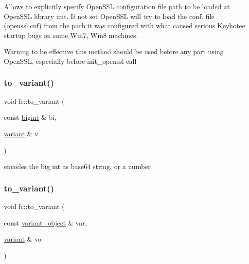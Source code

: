 Allows to explicitly specify Open\+S\+SL configuration file path to be loaded at Open\+S\+SL library init. If not set Open\+S\+SL will try to load the conf. file (openssl.\+cnf) from the path it was configured with what caused serious Keyhotee startup bugs on some Win7, Win8 machines. \begin{DoxyWarning}{Warning}
to be effective this method should be used before any part using Open\+S\+SL, especially before init\+\_\+openssl call 
\end{DoxyWarning}
\mbox{\label{namespacefc_a791852d6973eb602069f55baf2fc0620}} 
\subsubsection{\texorpdfstring{to\+\_\+variant()}{to\_variant()}\hspace{0.1cm}{\footnotesize\ttfamily [1/8]}}
{\footnotesize\ttfamily void fc\+::to\+\_\+variant (\begin{DoxyParamCaption}\item[{const \mbox{\hyperlink{classfc_1_1bigint}{bigint}} \&}]{bi,  }\item[{\mbox{\hyperlink{classfc_1_1variant}{variant}} \&}]{v }\end{DoxyParamCaption})}

encodes the big int as base64 string, or a number \mbox{\label{namespacefc_a9c3517403d70a91f419b410ce27c85e8}} 
\subsubsection{\texorpdfstring{to\+\_\+variant()}{to\_variant()}\hspace{0.1cm}{\footnotesize\ttfamily [2/8]}}
{\footnotesize\ttfamily void fc\+::to\+\_\+variant (\begin{DoxyParamCaption}\item[{const \mbox{\hyperlink{classfc_1_1variant__object}{variant\+\_\+object}} \&}]{var,  }\item[{\mbox{\hyperlink{classfc_1_1variant}{variant}} \&}]{vo }\end{DoxyParamCaption})}

\mbox{\label{namespacefc_a5dda2b00432404348bd4b1f2871ed515}} 
